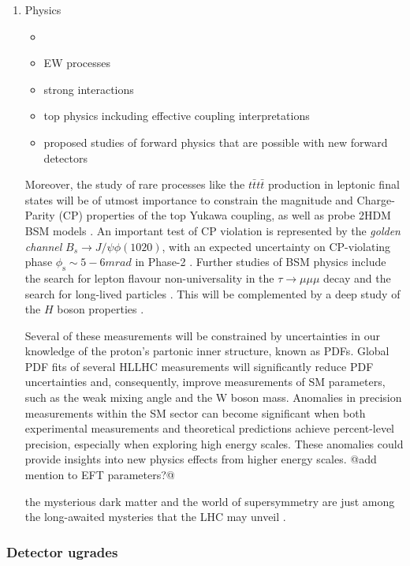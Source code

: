 \documentclass[11pt]{article}
\newcommand{\bspsiphi}{B_{s} \rightarrow J/\psi \phi}
\newcommand{\tautrimuon}{\tau \rightarrow \mu\mu\mu}
\newcommand{\ttbar}{t\bar{t}}
\begin{document}
\begin{enumerate}
\item Physics
\label{sec:orgf7a6904}
\begin{itemize}
\item \cite{hllhc_physics}
\item EW processes
\item strong interactions
\item top physics inckuding effective coupling interpretations
\item proposed studies of forward physics that are possible with new forward detectors
\end{itemize}

Moreover, the study of rare processes like the \(\ttbar\ttbar\) production in leptonic final states will be of utmost importance to constrain the magnitude and Charge-Parity (CP) properties of the top Yukawa coupling, as well as probe 2HDM BSM models \cite{HL-HE-LHC_YR}. An important test of CP violation is represented by the \emph{golden channel} \(\bspsiphi(1020)\), with an expected uncertainty on CP-violating phase \(\phi_{\text{s}}\sim5-6\unit{mrad}\) in Phase-2 \cite{HL-HE-LHC_YR}. Further studies of BSM physics include the search for lepton flavour non-universality in the \(\tautrimuon\) decay \cite{Muon_Phase2_TDR} and the search for long-lived particles \cite{HL-HE-LHC_YR}. This will be complemented by a deep study of the \(H\) boson properties \cite{CMS-PAS-FTR-18-011}. 
\cite{hllhc_physics}

Several of these measurements will be constrained by uncertainties in our knowledge of the proton's partonic inner structure, known as \acp{PDF}. Global \ac{PDF} fits of several \ac{HLLHC} measurements will significantly reduce \ac{PDF} uncertainties and, consequently, improve measurements of \ac{SM} parameters, such as the weak mixing angle and the W boson mass. Anomalies in precision measurements within the SM sector can become significant when both experimental measurements and theoretical predictions achieve percent-level precision, especially when exploring high energy scales. These anomalies could provide insights into new physics effects from higher energy scales. @add mention to EFT parameters?@


the mysterious dark matter and the world of supersymmetry are just among the long-awaited mysteries that the LHC may unveil \cite{hllhc_website}.
\end{enumerate}
\subsubsection{Detector ugrades}
\label{sec:orgb95e15d}
\label{sec:hllhc_detector_upgrades}
\end{document}
